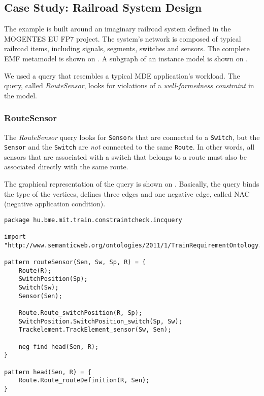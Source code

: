 
\subsection{Case Study: Railroad System Design}
\label{railroad-system}


The example is built around an imaginary railroad system defined in the \mbox{MOGENTES} EU FP7 \cite{MOGENTES} project. The system's network is composed of typical railroad items, including signals, segments, switches and sensors. The complete EMF metamodel is shown on . A subgraph of an instance model is shown on .

We used a query that resembles a typical MDE application's workload. The query, called \textit{RouteSensor}, looks for violations of a \emph{well-formedness constraint} in the model.


\subsubsection{RouteSensor}


The \textit{RouteSensor} query looks for \texttt{Sensor}s that are connected to a \texttt{Switch}, but the \texttt{Sensor} and the \texttt{Switch} are \emph{not} connected to the same \texttt{Route}. In other words, all sensors that are associated with a switch that belongs to a route must also be associated directly with the same route.

The graphical representation of the query is shown on . Basically, the query binds the type of the vertices, defines three edges and one negative edge, called NAC (negative application condition). 

\lstset{language=viatra}

\begin{lstlisting}[caption=The RouteSensor query in IQPL, label=lst:routesensor-iqpl]
package hu.bme.mit.train.constraintcheck.incquery

import "http://www.semanticweb.org/ontologies/2011/1/TrainRequirementOntology.owl" 

pattern routeSensor(Sen, Sw, Sp, R) = {
	Route(R);
	SwitchPosition(Sp);
	Switch(Sw);
	Sensor(Sen);
	
	Route.Route_switchPosition(R, Sp);
	SwitchPosition.SwitchPosition_switch(Sp, Sw);
	Trackelement.TrackElement_sensor(Sw, Sen);
	
	neg find head(Sen, R);	
}

pattern head(Sen, R) = {
	Route.Route_routeDefinition(R, Sen);
}
\end{lstlisting}

